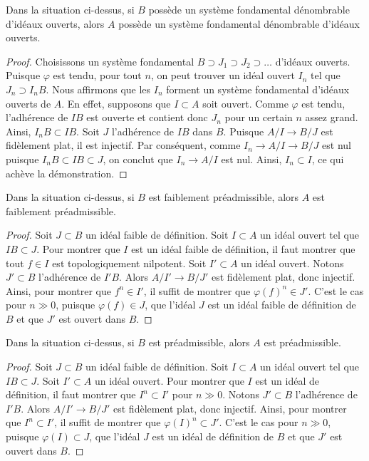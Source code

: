 \begin{lemma}
\label{lemma-taut-descent-countable}
Dans la situation ci-dessus, si $B$ possède un système fondamental dénombrable
d'idéaux ouverts, alors $A$ possède un système fondamental dénombrable d'idéaux ouverts.
\end{lemma}

\begin{proof}
Choisissons un système fondamental $B \supset J_1 \supset J_2 \supset \ldots$
d'idéaux ouverts. Puisque $\varphi$ est tendu, pour tout $n$, on peut trouver un
idéal ouvert $I_n$ tel que $J_n \supset I_nB$. Nous affirmons que les
$I_n$ forment un système fondamental d'idéaux ouverts de $A$.
En effet, supposons que $I \subset A$ soit ouvert. Comme $\varphi$ est tendu,
l'adhérence de $IB$ est ouverte et contient donc $J_n$ pour un certain $n$
assez grand. Ainsi, $I_nB \subset IB$. Soit $J$ l'adhérence de
$IB$ dans $B$. Puisque $A/I \to B/J$ est fidèlement plat, il est injectif.
Par conséquent, comme $I_n \to A/I \to B/J$ est nul puisque $I_nB \subset IB \subset J$,
on conclut que $I_n \to A/I$ est nul. Ainsi, $I_n \subset I$,
ce qui achève la démonstration.
\end{proof}

\begin{lemma}
\label{lemma-taut-descent-weakly-admissible}
Dans la situation ci-dessus, si $B$ est faiblement préadmissible, alors
$A$ est faiblement préadmissible.
\end{lemma}

\begin{proof}
Soit $J \subset B$ un idéal faible de définition. Soit $I \subset A$
un idéal ouvert tel que $IB \subset J$. Pour montrer que $I$ est un idéal faible
de définition, il faut montrer que tout $f \in I$ est topologiquement nilpotent.
Soit $I' \subset A$ un idéal ouvert. Notons $J' \subset B$ l'adhérence
de $I'B$. Alors $A/I' \to B/J'$ est fidèlement plat, donc injectif.
Ainsi, pour montrer que $f^n \in I'$, il suffit de montrer
que $\varphi(f)^n \in J'$. C'est le cas pour $n \gg 0$, puisque
$\varphi(f) \in J$, que l'idéal $J$ est un idéal faible de définition de $B$
et que $J'$ est ouvert dans $B$.
\end{proof}

\begin{lemma}
\label{lemma-taut-descent-admissible}
Dans la situation ci-dessus, si $B$ est préadmissible, alors $A$
est préadmissible.
\end{lemma}

\begin{proof}
Soit $J \subset B$ un idéal faible de définition. Soit $I \subset A$
un idéal ouvert tel que $IB \subset J$. Soit $I' \subset A$ un idéal ouvert.
Pour montrer que $I$ est un idéal de définition, il faut montrer que
$I^n \subset I'$ pour $n \gg 0$. Notons $J' \subset B$ l'adhérence
de $I'B$. Alors $A/I' \to B/J'$ est fidèlement plat, donc injectif.
Ainsi, pour montrer que $I^n \subset I'$, il suffit de montrer
que $\varphi(I)^n \subset J'$. C'est le cas pour $n \gg 0$, puisque
$\varphi(I) \subset J$, que l'idéal $J$ est un idéal de définition de $B$
et que $J'$ est ouvert dans $B$.
\end{proof}

